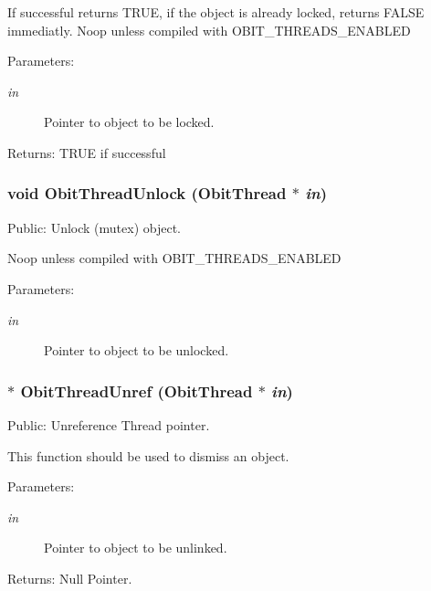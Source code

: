 If successful returns TRUE, if the object is already locked, returns FALSE immediatly. Noop unless compiled with OBIT\_\-THREADS\_\-ENABLED \begin{Desc}
\item[Parameters:]
\begin{description}
\item[{\em in}]Pointer to object to be locked. \end{description}
\end{Desc}
\begin{Desc}
\item[Returns:]TRUE if successful \end{Desc}
\subsubsection{\setlength{\rightskip}{0pt plus 5cm}void Obit\-Thread\-Unlock ({\bf Obit\-Thread} $\ast$ {\em in})}\label{ObitThread_8c_a9}


Public: Unlock (mutex) object. 

Noop unless compiled with OBIT\_\-THREADS\_\-ENABLED \begin{Desc}
\item[Parameters:]
\begin{description}
\item[{\em in}]Pointer to object to be unlocked. \end{description}
\end{Desc}
\subsubsection{$\ast$ Obit\-Thread\-Unref ({\bf Obit\-Thread} $\ast$ {\em in})}\label{ObitThread_8c_a6}


Public: Unreference Thread pointer. 

This function should be used to dismiss an object. \begin{Desc}
\item[Parameters:]
\begin{description}
\item[{\em in}]Pointer to object to be unlinked. \end{description}
\end{Desc}
\begin{Desc}
\item[Returns:]Null Pointer. \end{Desc}
